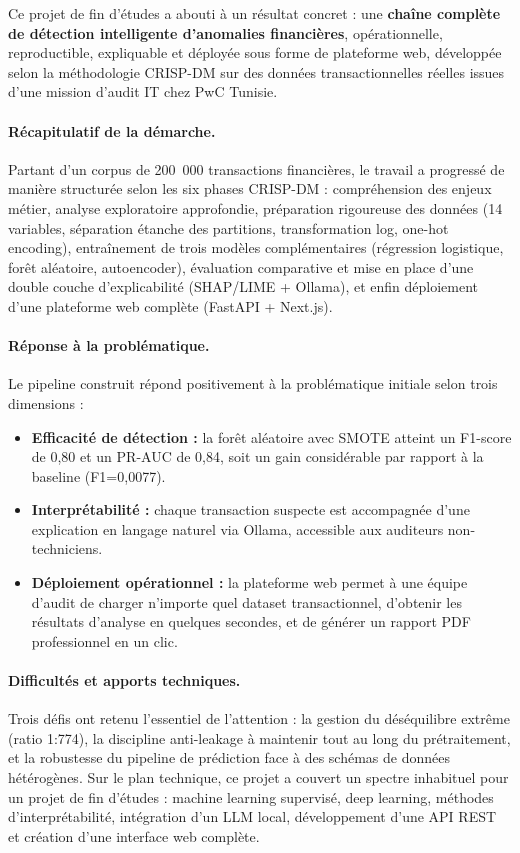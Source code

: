 \documentclass[12pt,a4paper,twoside]{report}
\begin{document}
Ce projet de fin d'études a abouti à un résultat concret : une \textbf{chaîne complète de détection intelligente d'anomalies financières}, opérationnelle, reproductible, expliquable et déployée sous forme de plateforme web, développée selon la méthodologie CRISP-DM sur des données transactionnelles réelles issues d'une mission d'audit IT chez PwC Tunisie.

\paragraph{Récapitulatif de la démarche.} Partant d'un corpus de 200~000 transactions financières, le travail a progressé de manière structurée selon les six phases CRISP-DM : compréhension des enjeux métier, analyse exploratoire approfondie, préparation rigoureuse des données (14 variables, séparation étanche des partitions, transformation log, one-hot encoding), entraînement de trois modèles complémentaires (régression logistique, forêt aléatoire, autoencoder), évaluation comparative et mise en place d'une double couche d'explicabilité (SHAP/LIME + Ollama), et enfin déploiement d'une plateforme web complète (FastAPI + Next.js).

\paragraph{Réponse à la problématique.} Le pipeline construit répond positivement à la problématique initiale selon trois dimensions :
\begin{itemize}
  \item \textbf{Efficacité de détection :} la forêt aléatoire avec SMOTE atteint un F1-score de 0,80 et un PR-AUC de 0,84, soit un gain considérable par rapport à la baseline (F1=0,0077).
  \item \textbf{Interprétabilité :} chaque transaction suspecte est accompagnée d'une explication en langage naturel via Ollama, accessible aux auditeurs non-techniciens.
  \item \textbf{Déploiement opérationnel :} la plateforme web permet à une équipe d'audit de charger n'importe quel dataset transactionnel, d'obtenir les résultats d'analyse en quelques secondes, et de générer un rapport PDF professionnel en un clic.
\end{itemize}

\paragraph{Difficultés et apports techniques.} Trois défis ont retenu l'essentiel de l'attention : la gestion du déséquilibre extrême (ratio 1:774), la discipline anti-leakage à maintenir tout au long du prétraitement, et la robustesse du pipeline de prédiction face à des schémas de données hétérogènes. Sur le plan technique, ce projet a couvert un spectre inhabituel pour un projet de fin d'études : machine learning supervisé, deep learning, méthodes d'interprétabilité, intégration d'un LLM local, développement d'une API REST et création d'une interface web complète.
\end{document}
